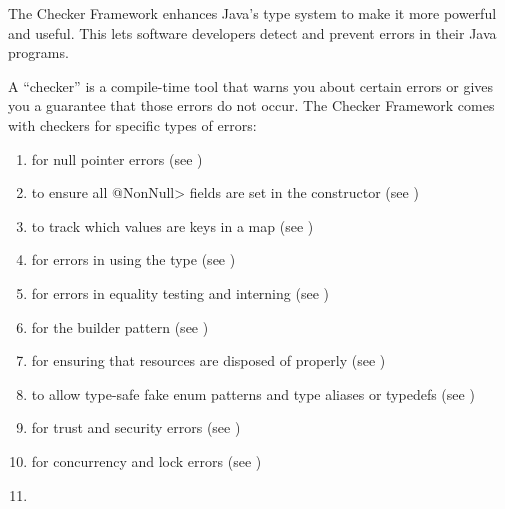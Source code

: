 \htmlhr
{}

The Checker Framework enhances Java's type system to make it more powerful
and useful.
This lets software developers detect and
prevent errors in their Java programs.

A ``checker'' is a compile-time tool that warns you about certain errors or gives you a
guarantee that those errors do not occur.
The Checker Framework comes with checkers for specific types of errors:

\begin{enumerate}

\item
   for null pointer errors
  (see )
\item
   to ensure all
  \<@NonNull> fields are set in the constructor (see
  )
\item
   to track which values are
  keys in a map (see )
\item
   for errors in using the
   type (see
  )
\item
   for errors in equality
  testing and interning (see )
\item
   for
  the builder pattern (see )
\item
   for ensuring that resources are disposed of properly
  (see )
\item
   to allow type-safe fake enum
  patterns and type aliases or typedefs (see )
\item
   for trust and security errors
  (see )
\item
   for concurrency and lock errors
  (see )
\item

\end{enumerate}
